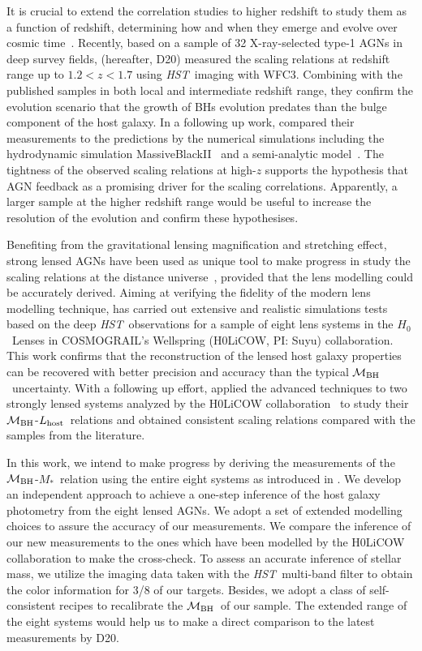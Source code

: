 \documentclass[fleqn,usenatbib]{mnras}
\newcommand{\hst}{{\it HST}}
\newcommand{\hc}{$H_0$}
\newcommand{\mbh}{$\mathcal M_{\rm BH}$}
\newcommand{\lhost}{$L_{\rm host}$}
\newcommand{\mstar}{{$M_*$}}
\begin{document}
It is crucial to extend the correlation studies to higher redshift to study them as a function of redshift, determining how and when they emerge and evolve over cosmic time~\citep[e.g.,][]{TMB04,Sal++06,Woo++06, Jah++09,SS13,Sun2015, Park15}. Recently, based on a sample of 32 X-ray-selected type-1 AGNs in deep survey fields, \citet{Ding2020a} (hereafter, D20) measured the scaling relations at redshift range up to $1.2<z<1.7$ using \hst\ imaging with WFC3. Combining with the published samples in both local and intermediate redshift range, they confirm the evolution scenario that the growth of BHs evolution predates than the bulge component of the host galaxy. In a following up work, \citep{Ding2020b} compared their measurements to the predictions by the numerical simulations including the hydrodynamic simulation MassiveBlackII~\citep{Khandai2015} and a semi-analytic model~\citep{Menci2014}. The tightness of the observed scaling relations at high-$z$ supports the hypothesis that AGN feedback as a promising driver for the scaling correlations. Apparently, a larger sample at the higher redshift range would be useful to increase the resolution of the evolution and confirm these hypothesises.

Benefiting from the gravitational lensing magnification and stretching effect, strong lensed AGNs have been used as unique tool to make progress in study the scaling relations at the distance universe~\citep{Peng2006}, provided that the lens modelling could be accurately derived. Aiming at verifying the fidelity of the modern lens modelling technique, \citet{Ding2017a} has carried out extensive and realistic simulations tests based on the deep \hst\ observations for a sample of eight lens systems in the \hc\ Lenses in COSMOGRAIL's Wellspring (H0LiCOW, PI: Suyu) collaboration. This work confirms that the reconstruction of the lensed host galaxy properties can be recovered with better precision and accuracy than the typical \mbh\ uncertainty. With a following up effort, \citet{Ding2017b} applied the advanced techniques to two strongly lensed systems analyzed by the H0LiCOW collaboration~\citep{Suyu2013, Wong2017} to study their \mbh-\lhost\ relations and obtained consistent scaling relations compared with the samples from the literature.

In this work, we intend to make progress by deriving the measurements of the \mbh-\mstar\ relation using the entire eight systems as introduced in \citet{Ding2017a}. We develop an independent approach to achieve a one-step inference of the host galaxy photometry from the eight lensed AGNs. We adopt a set of extended modelling choices to assure the accuracy of our measurements. We compare the inference of our new measurements to the ones which have been modelled by the H0LiCOW collaboration to make the cross-check. To assess an accurate inference of stellar mass, we utilize the imaging data taken with the \hst\ multi-band filter to obtain the color information for 3/8 of our targets. Besides, we adopt a class of self-consistent recipes to recalibrate the \mbh\ of our sample. The extended range of the eight systems would help us to make a direct comparison to the latest measurements by D20. 
\end{document}
